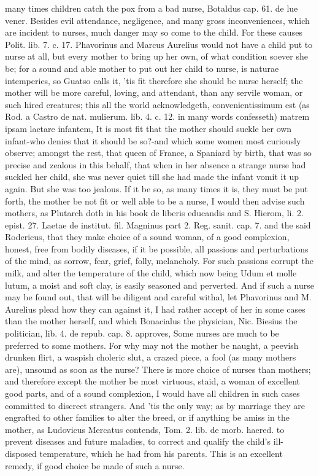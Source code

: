 {many times children catch the pox from a bad nurse, Botaldus cap. 61.
de lue vener. Besides evil attendance, negligence, and many gross
inconveniences, which are incident to nurses, much danger may so come
to the child. For these causes \Aristotle Polit. lib. 7. c. 17.
Phavorinus and Marcus Aurelius would not have a child put to nurse at
all, but every mother to bring up her own, of what condition soever she
be; for a sound and able mother to put out her child to nurse, is
naturae intemperies, so Guatso calls it, 'tis fit therefore she
should be nurse herself; the mother will be more careful, loving, and
attendant, than any servile woman, or such hired creatures; this all
the world acknowledgeth, convenientissimum est (as Rod. a Castro de
nat. mulierum. lib. 4. c. 12. in many words confesseth) matrem ipsam
lactare infantem, It is most fit that the mother should suckle her own
infant-who denies that it should be so?-and which some women most
curiously observe; amongst the rest, that queen of France, a
Spaniard by birth, that was so precise and zealous in this behalf, that
when in her absence a strange nurse had suckled her child, she was
never quiet till she had made the infant vomit it up again. But she was
too jealous. If it be so, as many times it is, they must be put forth,
the mother be not fit or well able to be a nurse, I would then advise
such mothers, as Plutarch doth in his book de liberis educandis
and S. Hierom, li. 2. epist. 27. Laetae de institut. fil.
Magninus part 2. Reg. sanit. cap. 7. and the said Rodericus, that they
make choice of a sound woman, of a good complexion, honest, free from
bodily diseases, if it be possible, all passions and perturbations of
the mind, as sorrow, fear, grief, folly, melancholy. For such
passions corrupt the milk, and alter the temperature of the child,
which now being  Udum et molle lutum, a moist and soft clay, is
easily seasoned and perverted. And if such a nurse may be found out,
that will be diligent and careful withal, let Phavorinus and M.
Aurelius plead how they can against it, I had rather accept of her in
some cases than the mother herself, and which Bonacialus the physician,
Nic. Biesius the politician, lib. 4. de repub. cap. 8. approves,
Some nurses are much to be preferred to some mothers. For why may
not the mother be naught, a peevish drunken flirt, a waspish choleric
slut, a crazed piece, a fool (as many mothers are), unsound as soon as
the nurse? There is more choice of nurses than mothers; and therefore
except the mother be most virtuous, staid, a woman of excellent good
parts, and of a sound complexion, I would have all children in such
cases committed to discreet strangers. And 'tis the only way; as by
marriage they are engrafted to other families to alter the breed, or if
anything be amiss in the mother, as Ludovicus Mercatus contends, Tom.
2. lib. de morb. haered. to prevent diseases and future maladies, to
correct and qualify the child's ill-disposed temperature, which he had
from his parents. This is an excellent remedy, if good choice be made
of such a nurse.

}
